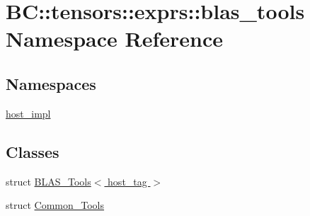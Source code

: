 \hypertarget{namespaceBC_1_1tensors_1_1exprs_1_1blas__tools}{}\section{BC\+:\+:tensors\+:\+:exprs\+:\+:blas\+\_\+tools Namespace Reference}
\label{namespaceBC_1_1tensors_1_1exprs_1_1blas__tools}
\subsection*{Namespaces}
\begin{DoxyCompactItemize}
\item 
 \hyperlink{namespaceBC_1_1tensors_1_1exprs_1_1blas__tools_1_1host__impl}{host\+\_\+impl}
\end{DoxyCompactItemize}
\subsection*{Classes}
\begin{DoxyCompactItemize}
\item 
struct \hyperlink{structBC_1_1tensors_1_1exprs_1_1blas__tools_1_1BLAS__Tools_3_01host__tag_01_4}{B\+L\+A\+S\+\_\+\+Tools$<$ host\+\_\+tag $>$}
\item 
struct \hyperlink{structBC_1_1tensors_1_1exprs_1_1blas__tools_1_1Common__Tools}{Common\+\_\+\+Tools}
\end{DoxyCompactItemize}
